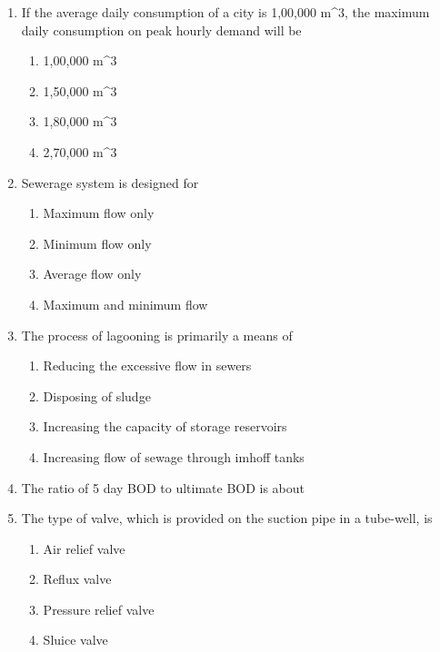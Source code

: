\documentclass[11pt,a4paper]{article}
\begin{document}
\begin{enumerate}
\item{If the average daily consumption of a city is 1,00,000 m\^{}3, the maximum daily consumption on peak hourly demand will be
}
\begin{enumerate}[label=\Alph*.]
\item{1,00,000 m\^{}3}
\item{1,50,000 m\^{}3}
\item{1,80,000 m\^{}3}
\item{2,70,000 m\^{}3}
\end{enumerate}
\item{Sewerage system is designed for}
\begin{enumerate}[label=\Alph*.]
\item{Maximum flow only}
\item{Minimum flow only}
\item{Average flow only}
\item{Maximum and minimum flow}
\end{enumerate}
\item{The process of lagooning is primarily a means of}
\begin{enumerate}[label=\Alph*.]
\item{Reducing the excessive flow in sewers}
\item{Disposing of sludge}
\item{Increasing the capacity of storage reservoirs}
\item{Increasing flow of sewage through imhoff tanks}
\end{enumerate}
\item{The ratio of 5 day BOD to ultimate BOD is about}
\\
\item{The type of valve, which is provided on the suction pipe in a tube-well, is}
\begin{enumerate}[label=\Alph*.]
\item{Air relief valve}
\item{Reflux valve}
\item{Pressure relief valve}
\item{Sluice valve}
\end{enumerate}

\end{enumerate}
\end{document}
